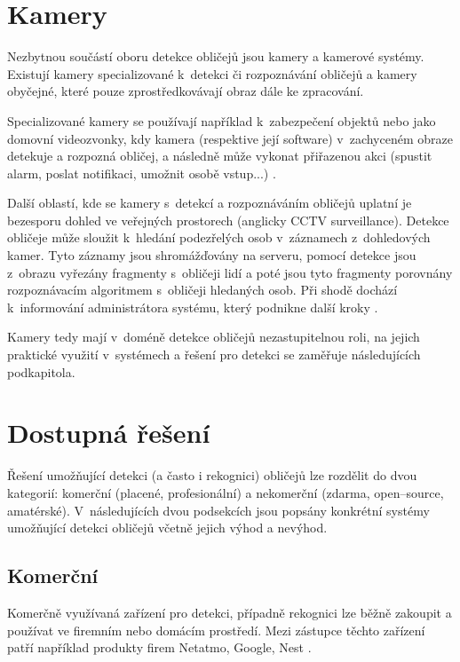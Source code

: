 \section{Kamery}
Nezbytnou součástí oboru detekce obličejů jsou kamery a kamerové systémy.
Existují kamery specializované k~detekci či rozpoznávání obličejů 
a kamery obyčejné, které pouze zprostředkovávají obraz dále ke zpracování.

Specializované kamery se používají například k~zabezpečení objektů nebo
jako domovní videozvonky, kdy kamera (respektive její software) v~zachyceném
obraze detekuje a rozpozná obličej, a následně může vykonat přiřazenou akci 
(spustit alarm, poslat notifikaci, umožnit osobě vstup...) \cite{securityCamsWeb}.

Další oblastí, kde se kamery s~detekcí a rozpoznáváním obličejů uplatní je
bezesporu dohled ve veřejných prostorech (anglicky CCTV surveillance). 
Detekce obličeje může sloužit k~hledání podezřelých osob v~záznamech z~dohledových
kamer. Tyto záznamy jsou shromážďovány na serveru, pomocí detekce jsou
z~obrazu vyřezány fragmenty s~obličeji lidí a poté jsou tyto fragmenty
porovnány rozpoznávacím algoritmem s~obličeji hledaných osob. Při shodě
dochází k~informování administrátora systému, který podnikne další kroky 
\cite{suspectIdentification}. 

Kamery tedy mají v~doméně detekce obličejů nezastupitelnou roli, na 
jejich praktické využití v~systémech a řešení pro detekci se zaměřuje následujících
podkapitola.

\section{Dostupná řešení}
Řešení umožňující detekci (a často i rekognici) obličejů lze rozdělit do dvou kategorií: 
komerční (placené, profesionální) a nekomerční (zdarma, open--source, amatérské).
V~následujících dvou podsekcích jsou popsány konkrétní systémy umožňující
detekci obličejů včetně jejich výhod a nevýhod.

\subsection*{Komerční}
Komerčně využívaná zařízení pro detekci, případně rekognici lze běžně zakoupit 
a používat ve firemním nebo domácím prostředí. Mezi zástupce těchto zařízení
patří například produkty firem Netatmo, Google, Nest \cite{securityCamsWeb2}.

